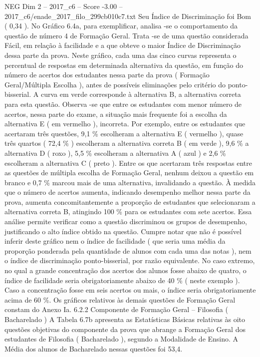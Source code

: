 \begin{textsample}{NEG Dim 2 – 2017\_c6 – Score -3.00 – 2017\_c6/enade\_2017\_filo\_299cb010c7.txt}
Seu Índice de Discriminação foi Bom ( 0,34 ).
No Gráfico 6.4a, para exemplificar, analisa -se o comportamento da questão de número 4 de Formação Geral.
Trata -se de uma questão considerada Fácil, em relação à facilidade e a que obteve o maior Índice de Discriminação dessa parte da prova.
Neste gráfico, cada uma das cinco curvas representa o percentual de respostas em determinada alternativa da questão, em função do número de acertos dos estudantes nessa parte da prova ( Formação Geral/Múltipla Escolha ), antes de possíveis eliminações pelo critério do ponto-bisserial.
A curva em verde corresponde à alternativa B, a alternativa correta para esta questão.
Observa -se que entre os estudantes com menor número de acertos, nessa parte do exame, a situação mais frequente foi a escolha da alternativa E ( em vermelho ), incorreta.
Por exemplo, entre os estudantes que acertaram três questões, 9,1 \% escolheram a alternativa E ( vermelho ), quase três quartos ( 72,4 \% ) escolheram a alternativa correta B ( em verde ), 9,6 \% a alternativa D ( roxo ), 5,5 \% escolheram a alternativa A ( azul ) e 2,6 \% escolheram a alternativa C ( preto ).
Entre os que acertaram três respostas entre as questões de múltipla escolha de Formação Geral, nenhum deixou a questão em branco e 0,7 \% marcou mais de uma alternativa, invalidando a questão.
À medida que o número de acertos aumenta, indicando desempenho melhor nessa parte da prova, aumenta concomitantemente a proporção de estudantes que selecionaram a alternativa correta B, atingindo 100 \% para os estudantes com sete acertos.
Essa análise permite verificar como a questão discriminou os grupos de desempenho, justificando o alto índice obtido na questão.
Cumpre notar que não é possível inferir deste gráfico nem o índice de facilidade ( que seria uma média da proporção ponderada pela quantidade de alunos com cada uma das notas ), nem o índice de discriminação ponto-bisserial, por razão equivalente.
No caso extremo, no qual a grande concentração dos acertos dos alunos fosse abaixo de quatro, o índice de facilidade seria obrigatoriamente abaixo de 40 \% ( neste exemplo ).
Caso a concentração fosse em seis acertos ou mais, o índice seria obrigatoriamente acima de 60 \%.
Os gráficos relativos às demais questões de Formação Geral constam do Anexo Ia. 6.2.2 Componente de Formação Geral – Filosofia ( Bacharelado ) A Tabela 6.7b apresenta as Estatísticas Básicas relativas às oito questões objetivas do componente da prova que abrange a Formação Geral dos estudantes de Filosofia ( Bacharelado ), segundo a Modalidade de Ensino.
A Média dos alunos de Bacharelado nessas questões foi 53,4.

\end{textsample}
